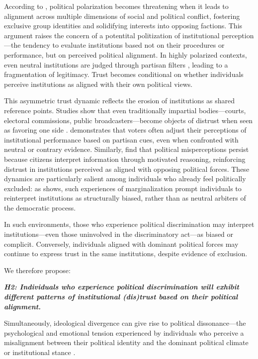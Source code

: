 \documentclass{article}
\begin{document}
According to \textcite{baldassarri_partisans_2008}, political polarization becomes threatening when it leads to alignment across multiple dimensions of social and political conflict, fostering exclusive group identities and solidifying interests into opposing factions. This argument raises the concern of a potentital politization of institutional perception—the tendency to evaluate institutions based not on their procedures or performance, but on perceived political alignment. In highly polarized contexts, even neutral institutions are judged through partisan filters \parencite{rogowski_how_2016, druckman_what_2019}, leading to a fragmentation of legitimacy. Trust becomes conditional on whether individuals perceive institutions as aligned with their own political views.

This asymmetric trust dynamic reflects the erosion of institutions as shared reference points. Studies show that even traditionally impartial bodies—courts, electoral commissions, public broadcasters—become objects of distrust when seen as favoring one side \parencite{keefer_trust_2022}. \textcite{lenz_follow_2012} demonstrates that voters often adjust their perceptions of institutional performance based on partisan cues, even when confronted with neutral or contrary evidence. Similarly, \textcite{nyhan_when_2010} find that political misperceptions persist because citizens interpret information through motivated reasoning, reinforcing distrust in institutions perceived as aligned with opposing political forces. These dynamics are particularly salient among individuals who already feel politically excluded: as \textcite{oskooii_perceived_2020} shows, such experiences of marginalization prompt individuals to reinterpret institutions as structurally biased, rather than as neutral arbiters of the democratic process. 

In such environments, those who experience political discrimination may interpret institutions—even those uninvolved in the discriminatory act—as biased or complicit. Conversely, individuals aligned with dominant political forces may continue to express trust in the same institutions, despite evidence of exclusion.

We therefore propose:

\emph{\textbf{\small
H2: Individuals who experience political discrimination will exhibit different patterns of institutional (dis)trust based on their political alignment.
}}

Simultaneously, ideological divergence can give rise to political dissonance—the psychological and emotional tension experienced by individuals who perceive a misalignment between their political identity and the dominant political climate or institutional stance \parencite{lelkes_limits_2017, federico_ideological_2012}. 
\end{document}
